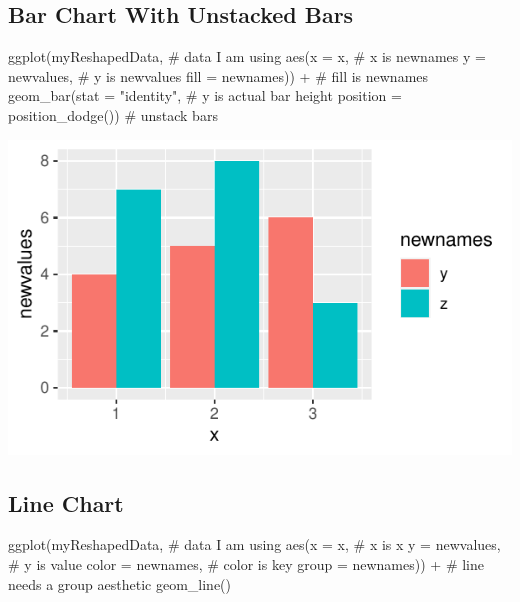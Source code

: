 \documentclass[nofonts,]{tufte-handout}
\newenvironment{Shaded}{}{}
\newcommand{\AttributeTok}[1]{#1}
\newcommand{\CommentTok}[1]{\textcolor[rgb]{0.00,0.50,0.00}{#1}}
\newcommand{\FunctionTok}[1]{#1}
\newcommand{\NormalTok}[1]{#1}
\newcommand{\SpecialCharTok}[1]{\textcolor[rgb]{0.00,0.50,0.50}{#1}}
\newcommand{\StringTok}[1]{\textcolor[rgb]{0.00,0.50,0.50}{#1}}
\begin{document}
\hypertarget{bar-chart-with-unstacked-bars}{%
\subsection{Bar Chart With Unstacked
Bars}\label{bar-chart-with-unstacked-bars}}

\begin{Shaded}
\begin{Highlighting}[]
\FunctionTok{ggplot}\NormalTok{(myReshapedData, }\CommentTok{\# data I am using}
       \FunctionTok{aes}\NormalTok{(}\AttributeTok{x =}\NormalTok{ x, }\CommentTok{\# x is newnames}
           \AttributeTok{y =}\NormalTok{ newvalues, }\CommentTok{\# y is newvalues}
           \AttributeTok{fill =}\NormalTok{ newnames)) }\SpecialCharTok{+} \CommentTok{\# fill is newnames}
  \FunctionTok{geom\_bar}\NormalTok{(}\AttributeTok{stat =} \StringTok{"identity"}\NormalTok{, }\CommentTok{\# y is actual bar height}
           \AttributeTok{position =} \FunctionTok{position\_dodge}\NormalTok{()) }\CommentTok{\# unstack bars}
\end{Highlighting}
\end{Shaded}

\includegraphics{bar-charts-in-ggplot-with-multiple-outcomes_files/figure-latex/unnamed-chunk-6-1}

\hypertarget{line-chart}{%
\subsection{Line Chart}\label{line-chart}}

\begin{Shaded}
\begin{Highlighting}[]
\FunctionTok{ggplot}\NormalTok{(myReshapedData, }\CommentTok{\# data I am using}
       \FunctionTok{aes}\NormalTok{(}\AttributeTok{x =}\NormalTok{ x, }\CommentTok{\# x is x}
           \AttributeTok{y =}\NormalTok{ newvalues, }\CommentTok{\# y is value}
           \AttributeTok{color =}\NormalTok{ newnames, }\CommentTok{\# color is key}
           \AttributeTok{group =}\NormalTok{ newnames)) }\SpecialCharTok{+} \CommentTok{\# line needs a group aesthetic}
  \FunctionTok{geom\_line}\NormalTok{()}
\end{Highlighting}
\end{Shaded}
\end{document}
